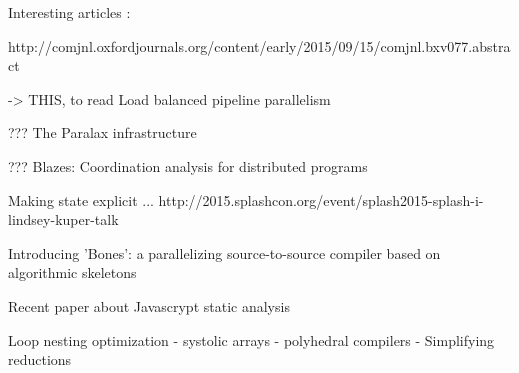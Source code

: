 Interesting articles :

http://comjnl.oxfordjournals.org/content/early/2015/09/15/comjnl.bxv077.abstract


-> THIS, to read
Load balanced pipeline parallelism \cite{Kamruzzaman2013}


??? The Paralax infrastructure \cite{Vandierendonck2010a}

??? Blazes: Coordination analysis for distributed programs \cite{Alvaro2014}

Making state explicit ... \cite{Fernandez2014a}
http://2015.splashcon.org/event/splash2015-splash-i-lindsey-kuper-talk


Introducing 'Bones': a parallelizing source-to-source compiler based on algorithmic skeletons \cite{Nugteren2012}


Recent paper about Javascrypt static analysis \cite{Chudnov2015}



Loop nesting optimization
- systolic arrays
- polyhedral compilers
- Simplifying reductions 


\cite{Mendis2015}